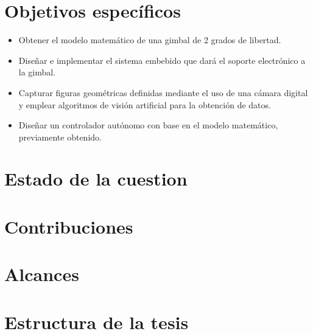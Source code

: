 \section{Objetivos específicos}
\begin{itemize}
    \item Obtener el modelo matemático de una gimbal de 2 grados de libertad.
    \item Diseñar e implementar el sistema embebido que dará el soporte electrónico a la gimbal.
    \item Capturar figuras geométricas definidas  mediante el uso de una cámara digital y emplear algoritmos de visión artificial para la obtención de datos. 
    \item Diseñar un controlador autónomo con base en el modelo matemático, previamente obtenido.
    \end{itemize}

\section{Estado de la cuestion}

\section{Contribuciones}

\section{Alcances}


\section{Estructura de la tesis}